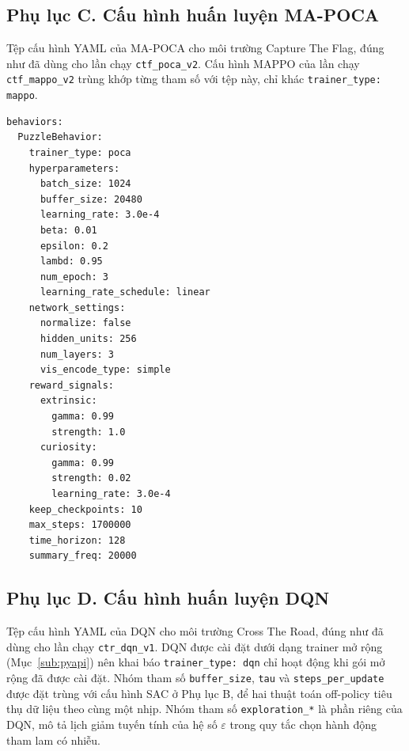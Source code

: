\subsection*{Phụ lục C. Cấu hình huấn luyện MA-POCA}

Tệp cấu hình YAML của MA-POCA cho môi trường Capture The Flag, đúng như đã dùng cho lần
chạy \texttt{ctf\_poca\_v2}. Cấu hình MAPPO của lần chạy \texttt{ctf\_mappo\_v2} trùng
khớp từng tham số với tệp này, chỉ khác \texttt{trainer\_type: mappo}.

\begin{lstlisting}[basicstyle=\ttfamily\scriptsize,caption={ctf\_poca.yaml},captionpos=b]
behaviors:
  PuzzleBehavior:
    trainer_type: poca
    hyperparameters:
      batch_size: 1024
      buffer_size: 20480
      learning_rate: 3.0e-4
      beta: 0.01
      epsilon: 0.2
      lambd: 0.95
      num_epoch: 3
      learning_rate_schedule: linear
    network_settings:
      normalize: false
      hidden_units: 256
      num_layers: 3
      vis_encode_type: simple
    reward_signals:
      extrinsic:
        gamma: 0.99
        strength: 1.0
      curiosity:
        gamma: 0.99
        strength: 0.02
        learning_rate: 3.0e-4
    keep_checkpoints: 10
    max_steps: 1700000
    time_horizon: 128
    summary_freq: 20000
\end{lstlisting}

\subsection*{Phụ lục D. Cấu hình huấn luyện DQN}

Tệp cấu hình YAML của DQN cho môi trường Cross The Road, đúng như đã dùng cho lần chạy
\texttt{ctr\_dqn\_v1}. DQN được cài đặt dưới dạng trainer mở rộng (Mục~\ref{sub:pyapi})
nên khai báo \texttt{trainer\_type: dqn} chỉ hoạt động khi gói mở rộng đã được cài đặt.
Nhóm tham số \texttt{buffer\_size}, \texttt{tau} và \texttt{steps\_per\_update} được đặt
trùng với cấu hình SAC ở Phụ lục B, để hai thuật toán off-policy tiêu thụ dữ liệu theo
cùng một nhịp. Nhóm tham số \texttt{exploration\_*} là phần riêng của DQN, mô tả lịch
giảm tuyến tính của hệ số $\varepsilon$ trong quy tắc chọn hành động tham lam có nhiễu.

